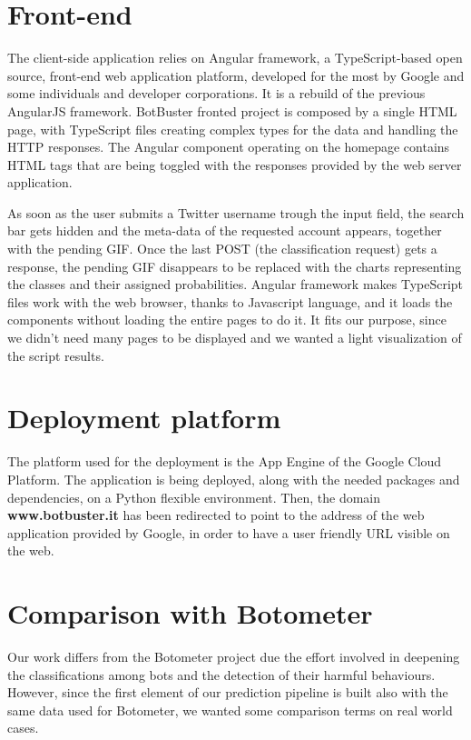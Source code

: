 \section{Front-end}
The client-side application relies on Angular framework, a TypeScript-based open source, front-end web application platform, developed for the most by Google and some individuals and developer corporations.
It is a rebuild of the previous AngularJS framework.
BotBuster fronted project is composed by a single HTML page, with TypeScript files creating complex types for the data and handling the HTTP responses.
The Angular component operating on the homepage contains HTML tags that are being toggled with the responses provided by the web server application.

As soon as the user submits a Twitter username trough the input field, the search bar gets hidden and the meta-data of the requested account appears, together with the pending GIF. Once the last POST (the classification request) gets a response, the pending GIF disappears to be replaced with the charts representing the classes and their assigned probabilities. 
Angular framework makes TypeScript files work with the web browser, thanks to Javascript language, and it loads the components without loading the entire pages to do it. It fits our purpose, since we didn't need many pages to be displayed and we wanted a light visualization of the script results.

\section{Deployment platform}
The platform used for the deployment is the App Engine of the Google Cloud Platform.
The application is being deployed, along with the needed packages and dependencies, on a Python flexible environment.
Then, the domain \textbf{www.botbuster.it} has been redirected to point to the address of the web application provided by Google, in order to have a user friendly URL visible on the web.
\section{Comparison with Botometer}
Our work differs from the Botometer project due the effort involved in deepening the classifications among bots and the detection of their harmful behaviours.
However, since the first element of our prediction pipeline is built also with the same data used for Botometer, we wanted some comparison terms on real world cases.


